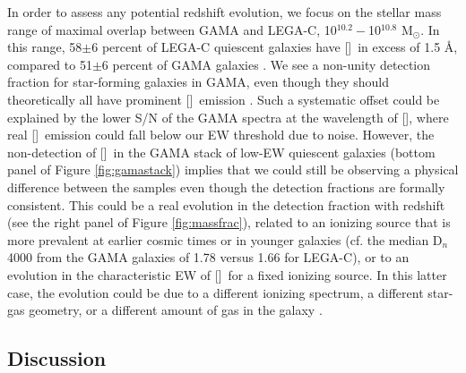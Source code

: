 \documentclass[twocolumn,natbib,iop,hyperref]{aastex62}
\newcommand{\msol}{M$_{\odot}$}
\newcommand{\oii}{[\ion{O}{2}]}
\begin{document}
In order to assess any potential redshift evolution, we focus on the stellar mass range of maximal overlap between GAMA and LEGA-C, 10$^{10.2}-$10$^{10.8}$ \msol.  In this range, 58$\pm$6 percent of LEGA-C quiescent galaxies have \oii\ in excess of 1.5 \AA, compared to 51$\pm$6 percent of GAMA galaxies \cite[see also][]{2006ApJ...648..281Y}.  We see a non-unity detection fraction for star-forming galaxies in GAMA, even though they should theoretically all have prominent \oii\ emission \citep{2001ApJ...551..825J,2004AJ....127.2002K}.  Such a systematic offset could be explained by the lower S/N of the GAMA spectra at the wavelength of \oii, where real \oii\ emission could fall below our EW threshold due to noise.  However, the non-detection of \oii\ in the GAMA stack of low-EW quiescent galaxies (bottom panel of Figure \ref{fig:gamastack}) implies that we could still be observing a physical difference between the samples even though the detection fractions are formally consistent.  This could be a real evolution in the detection fraction with redshift (see the right panel of Figure \ref{fig:massfrac}), related to an ionizing source that is more prevalent at earlier cosmic times or in younger galaxies (cf. the median D$_n$4000 from the GAMA galaxies of 1.78 versus 1.66 for LEGA-C), or to an evolution in the characteristic EW of \oii\ for a fixed ionizing source.  In this latter case, the evolution could be due to a different ionizing spectrum, a different star-gas geometry, or a different amount of gas in the galaxy \cite[e.g.][]{2018ApJ...860..103S}.

\subsection{Discussion}
\label{sec:discussion}
\end{document}
